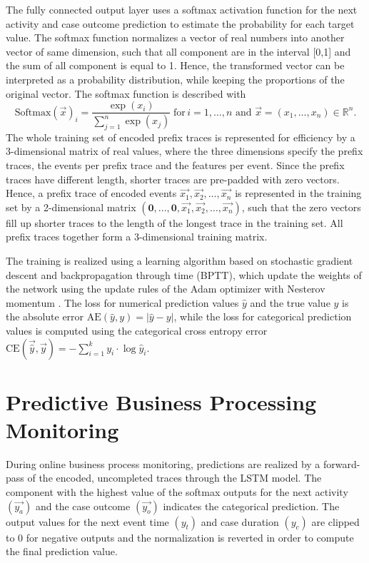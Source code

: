 The fully connected output layer uses a softmax activation function for the next activity and case outcome prediction to estimate the probability for each target value.
The softmax function normalizes a vector of real numbers into another vector of same dimension, such that all component are in the interval [0,1] and the sum of all component is equal to 1.
Hence, the transformed vector can be interpreted as a probability distribution, while keeping the proportions of the original vector.
The softmax function is described with
\begin{equation*}\label{key}
	\text{Softmax}(\vec{x})_i = \frac{\exp(x_i)}{\sum_{j=1}^{n} \exp(x_j)}  \; \text{for} \, i = 1, \dots, n \text{ and } \vec{x}=(x_1, \dots, x_n) \in \mathbb{R}^n.
\end{equation*}
The whole training set of encoded prefix traces is represented for efficiency by a 3-dimensional matrix of real values, where the three dimensions specify the prefix traces, the events per prefix trace and the features per event.
Since the prefix traces have different length, shorter traces are pre-padded \cite{DBLP:journals/corr/abs-1903-07288} with zero vectors.
Hence, a prefix trace of encoded events $\vec{x_1}, \vec{x_2}, \dots, \vec{x_n}$  is represented in the training set by a 2-dimensional matrix $(\mathbf{0}, \dots, \mathbf{0},\vec{x_1}, \vec{x_2}, \dots, \vec{x_n})$, such that the zero vectors fill up shorter traces to the length of the longest trace in the training set.
All prefix traces together form a 3-dimensional training matrix.

The training is realized using a learning algorithm based on stochastic gradient descent and backpropagation through time (BPTT), which update the weights of the network using the update rules of the Adam optimizer with Nesterov momentum \cite{dozat2016incorporating}.
The loss for numerical prediction values $\hat{y}$ and the true value $y$ is the absolute error $\text{AE}(\hat{y},y)=|\hat{y} - y|$, while the loss for categorical prediction values is computed using the categorical cross entropy error $\text{CE}(\vec{\hat{y}}, \vec{y}) = - \sum_{i=1}^{k} y_i \cdot \log \hat{y}_i$.

\section{Predictive Business Processing Monitoring}

During online business process monitoring, predictions are realized by a forward-pass of the encoded, uncompleted traces through the LSTM model.
The component with the highest value of the softmax outputs for the next activity $(\vec{y_a})$ and the case outcome $(\vec{y_o})$ indicates the categorical prediction.
The output values for the next event time $(y_t)$ and case duration  $(y_c)$ are clipped to 0 for negative outputs and the normalization is reverted in order to compute the final prediction value.

